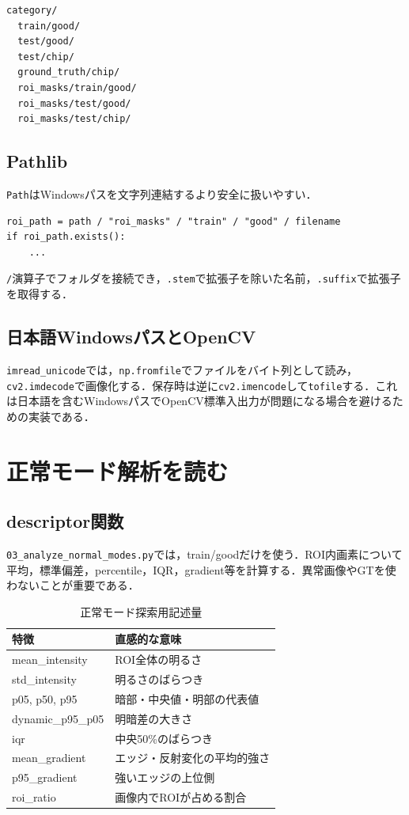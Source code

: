 \documentclass[a4paper,11pt]{ltjsreport}
\begin{document}
\begin{verbatim}
category/
  train/good/
  test/good/
  test/chip/
  ground_truth/chip/
  roi_masks/train/good/
  roi_masks/test/good/
  roi_masks/test/chip/
\end{verbatim}

\section{Pathlib}
\texttt{Path}はWindowsパスを文字列連結するより安全に扱いやすい．

\begin{lstlisting}
roi_path = path / "roi_masks" / "train" / "good" / filename
if roi_path.exists():
    ...
\end{lstlisting}

\texttt{/}演算子でフォルダを接続でき，\texttt{.stem}で拡張子を除いた名前，\texttt{.suffix}で拡張子を取得する．

\section{日本語WindowsパスとOpenCV}
\texttt{imread\_unicode}では，\texttt{np.fromfile}でファイルをバイト列として読み，\texttt{cv2.imdecode}で画像化する．保存時は逆に\texttt{cv2.imencode}して\texttt{tofile}する．これは日本語を含むWindowsパスでOpenCV標準入出力が問題になる場合を避けるための実装である．

\chapter{正常モード解析を読む}

\section{descriptor関数}
\texttt{03\_analyze\_normal\_modes.py}では，train/goodだけを使う．ROI内画素について平均，標準偏差，percentile，IQR，gradient等を計算する．異常画像やGTを使わないことが重要である．

\begin{table}[H]
\centering
\caption{正常モード探索用記述量}
\begin{tabularx}{\linewidth}{L{45mm} Y}
\toprule
特徴 & 直感的な意味 \\
\midrule
mean\_intensity & ROI全体の明るさ \\
std\_intensity & 明るさのばらつき \\
p05, p50, p95 & 暗部・中央値・明部の代表値 \\
dynamic\_p95\_p05 & 明暗差の大きさ \\
iqr & 中央50\%のばらつき \\
mean\_gradient & エッジ・反射変化の平均的強さ \\
p95\_gradient & 強いエッジの上位側 \\
roi\_ratio & 画像内でROIが占める割合 \\
\bottomrule
\end{tabularx}
\end{table}
\end{document}

